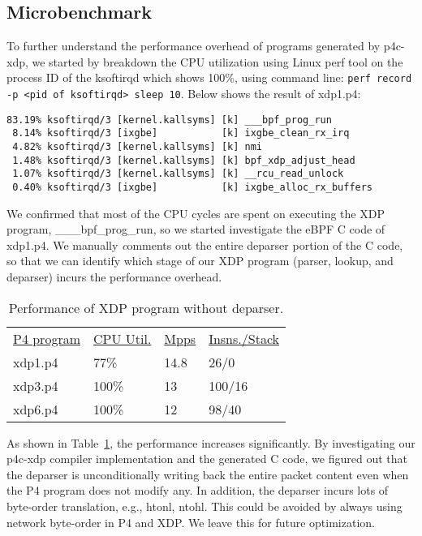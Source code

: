 \subsection{Microbenchmark}
To further understand the performance overhead of programs generated by p4c-xdp,
we started by breakdown the CPU utilization using Linux perf tool on
the process ID of the ksoftirqd which shows 100\%, using command line:
\texttt{perf record -p <pid of ksoftirqd> sleep 10}.
Below shows the result of xdp1.p4:
{\scriptsize
\begin{verbatim}
83.19% ksoftirqd/3 [kernel.kallsyms] [k] ___bpf_prog_run
 8.14% ksoftirqd/3 [ixgbe]           [k] ixgbe_clean_rx_irq
 4.82% ksoftirqd/3 [kernel.kallsyms] [k] nmi
 1.48% ksoftirqd/3 [kernel.kallsyms] [k] bpf_xdp_adjust_head
 1.07% ksoftirqd/3 [kernel.kallsyms] [k] __rcu_read_unlock
 0.40% ksoftirqd/3 [ixgbe]           [k] ixgbe_alloc_rx_buffers
\end{verbatim}
}
We confirmed that most of the CPU cycles are spent on executing the
XDP program, \_\_\_bpf\_prog\_run, so we started investigate the
eBPF C code of xdp1.p4.
We manually {\emph comments out} the entire deparser portion of the C code, so that
we can identify which stage of our XDP program (parser, lookup, and deparser) incurs
the performance overhead.

\begin{table}
\centering
\small
\begin{tabular}{llll}
  \underline{P4 program} & \underline{CPU Util.} & \underline{Mpps} & \underline{Insns./Stack}\\
  xdp1.p4 &  77\% &  14.8 & 26/0 \\
  xdp3.p4 &  100\% &  13 & 100/16 \\
  xdp6.p4 &  100\% &  12 & 98/40 \\
\end{tabular}
\caption{\footnotesize Performance of XDP program without deparser.}
\label{tab:perf2}
\end{table}

As shown in Table~\ref{tab:perf2}, the performance increases significantly.
By investigating our p4c-xdp compiler implementation and the generated C
code, we figured out that the deparser is unconditionally writing back
the entire packet content even when the P4 program does not modify any.
In addition, the deparser incurs lots of byte-order translation, e.g.,
htonl, ntohl. This could be avoided by always using network byte-order
in P4 and XDP. We leave this for future optimization.
